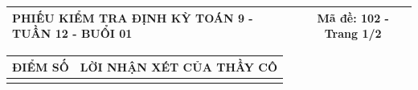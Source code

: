 \documentclass[12pt,a4paper]{article}
\begin{document}
\newpage
\noindent
\begin{tabularx}{\linewidth}{|X|c|}
\hline
\textbf{PHIẾU KIỂM TRA ĐỊNH KỲ TOÁN 9 - TUẦN 12 - BUỔI 01} & \textbf{Mã đề: 102 - Trang 1/2} \\
\hline
\end{tabularx}

\vspace{1.0mm}

\noindent
\begin{tabularx}{\linewidth}{|p{3.2cm}|X|}
\hline
\centering\textbf{ĐIỂM SỐ} & \centering\textbf{LỜI NHẬN XÉT CỦA THẦY CÔ} \tabularnewline
\hline
\rule{0pt}{1.8cm} & \tabularnewline
\hline
\end{tabularx}
\end{document}

